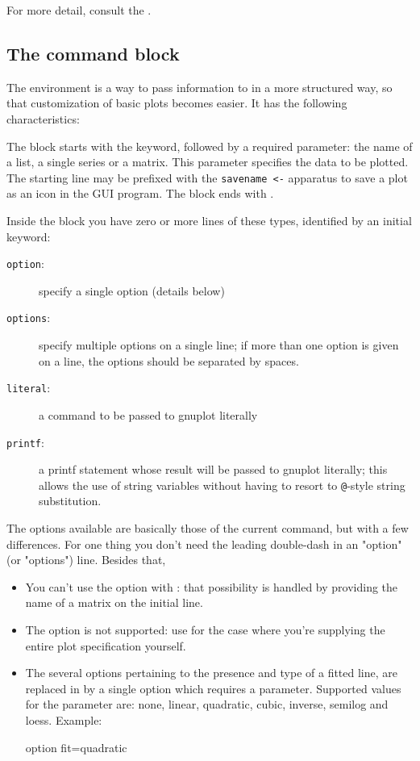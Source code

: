 For more detail, consult the \GCR.


\subsection{The  command block}
\label{sec:plotblock}

The  environment is a way to pass information to
 in a more structured way, so that customization of basic
plots becomes easier. It has the following characteristics:

The block starts with the  keyword, followed by a required
parameter: the name of a list, a single series or a matrix. This
parameter specifies the data to be plotted. The starting line may be
prefixed with the \verb|savename <-| apparatus to save a plot as an icon
in the GUI program. The block ends with .

Inside the block you have zero or more lines of these types, identified 
by an initial keyword:
\begin{description}
\item[\normalfont \texttt{option}:] specify a single option (details below)
\item[\normalfont \texttt{options}:] specify multiple options on a single line; if
  more than one option is given on a line, the options should be
  separated by spaces.
\item[\normalfont \texttt{literal}:] a command to be passed to gnuplot literally 
\item[\normalfont \texttt{printf}:] a printf statement whose result will be passed
  to gnuplot literally; this allows the use of string variables
  without having to resort to \verb!@!-style string substitution.
\end{description}

The options available are basically those of the current  
command, but with a few differences. For one thing you don't need the 
leading double-dash in an "option" (or "options") line. Besides that,
\begin{itemize}
\item You can't use the option  with :
  that possibility is handled by providing the name of a matrix on the
  initial  line.
\item The  option is not supported: use
   for the case where you're supplying the entire plot
  specification yourself.
\item The several options pertaining to the presence and type of a
  fitted line, are replaced in  by a single option  which
  requires a parameter. Supported values for the parameter are: none,
  linear, quadratic, cubic, inverse, semilog and loess. Example:
\begin{code}
  option fit=quadratic
\end{code}
\end{itemize}

